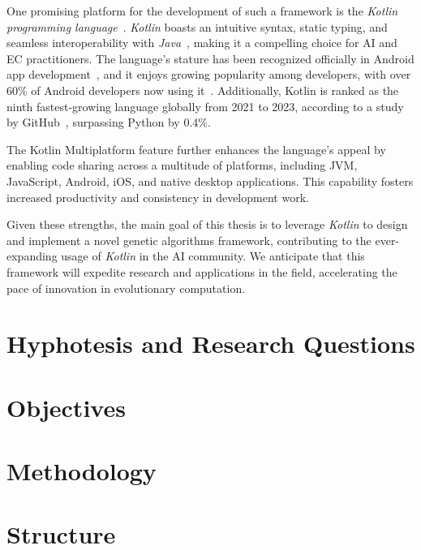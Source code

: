     One promising platform for the development of such a framework is the
    \emph{Kotlin programming language}~\autocite{KotlinProgrammingLanguagea}.
    \textit{Kotlin} boasts an intuitive syntax, static typing, and seamless
    interoperability with
    \textit{Java}~\autocite{CallingJavaKotlin,CallingKotlinJava,KotlinJavaInteropGuide},
    making it a compelling choice for AI and EC practitioners.
    The language's stature has been recognized officially in Android app
    development~\autocite{AndroidKotlinfirstApproach}, and it enjoys growing
    popularity among developers, with over 60\% of Android developers now using
    it~\autocite{LatestProgrammingLanguages2023}.
    Additionally, Kotlin is ranked as the ninth fastest-growing language
    globally from 2021 to 2023, according to a study by
    GitHub~\autocite{TopProgrammingLanguages}, surpassing Python by 0.4\%.

    The Kotlin Multiplatform feature further enhances the language's appeal by
    enabling code sharing across a multitude of platforms, including JVM,
    JavaScript, Android, iOS, and native desktop applications.
    This capability fosters increased productivity and consistency in
    development work.

    Given these strengths, the main goal of this thesis is to leverage
    \textit{Kotlin} to design and implement a novel genetic algorithms
    framework, contributing to the ever-expanding usage of \textit{Kotlin} in
    the AI community.
    We anticipate that this framework will expedite research and applications in
    the field, accelerating the pace of innovation in evolutionary computation.

  \section{Hyphotesis and Research Questions}
  \label{sec:hyphotesis_and_research_questions}
    \Blindtext
  \section{Objectives}
  \label{sec:objectives}
    \Blindtext
  \section{Methodology}
  \label{sec:methodology}
    \Blindtext
  \section{Structure}
  \label{sec:structure}
    \Blindtext